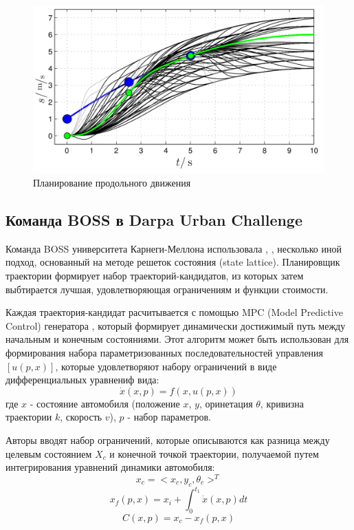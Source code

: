 \begin{figure}[h]
    \centering
    \includegraphics[width=0.7\linewidth]{images/junior_pathes_lon}
    \caption{Планирование продольного движения}
    \label{img:junior_pathes_lon}
\end{figure}

\subsection{Команда BOSS в Darpa Urban Challenge}
Команда BOSS университета  Карнеги-Меллона использовала \cite{darpa_boss}, \cite{darpa_boss_2}, \cite{darpa_boss_3}
несколько иной подход, основанный на методе решеток состояния (state lattice). Планировщик траектории формирует набор
траекторий-кандидатов, из которых затем выбтирается лучшая, удовлетворяющая ограничениям и функции стоимости.

Каждая траектория-кандидат расчитывается с помощью MPC (Model Predictive Control) генератора \cite{darpa_boss_kelly},
который формирует динамически достижимый путь между начальным и конечным состояниями. Этот алгоритм может быть
использован для формирования набора параметризованных последовательностей управления $[u(p,x)]$, которые удовлетворяют
набору ограничений в виде дифференциальных уравнениф вида:
\begin{equation}
\dot{x}(x, p) = f(x, u(p,x))
\end{equation}
где $x$ - состояние автомобиля
(положение $x$, $y$, оринетация $\theta$, кривизна траектории $k$, скорость $v$), $p$ - набор параметров.

Авторы вводят набор ограничений, которые описываются как разница между целевым состоянием $X_c$ и конечной точкой траектории,
получаемой путем интегрирования уравнений динамики автомобиля:
\begin{equation}
    x_c = <x_c, y_c, \theta_c>^T
\end{equation}
\begin{equation}
    x_f(p,x) = x_{i} + \int_0^{t_1}{\dot{x}(x, p)dt}
\end{equation}
\begin{equation}
    C(x, p) = x_c - x_f(p,x)
\end{equation}

